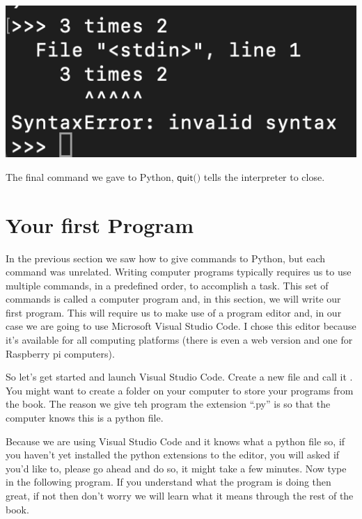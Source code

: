 \begin{center}
    \includegraphics[width=0.3\linewidth]{images/screenshots/SyntaxError.png}
\end{center}

The final command we gave to Python, $\textsf{quit()}$ tells the interpreter to close.

\section{Your first Program}



In the previous section we saw how to give commands to Python, but each command was unrelated. Writing computer programs typically requires us to use multiple commands, in a predefined order, to accomplish a task. This set of commands is called a computer program and, in this section, we will write our first program. This will require us to make use of a program editor and, in our case we are going to use Microsoft Visual Studio Code. I chose this editor because it's available for all computing platforms (there is even a web version and one for Raspberry pi computers).

So let's get started and launch Visual Studio Code. Create a new file and call it . You might want to create a folder on your computer to store your programs from the book. The reason we give teh program the extension ``.py'' is so that the computer knows this is a python file.

Because we are using Visual Studio Code and it knows what a python file so, if you haven't yet installed the python extensions to the editor, you will asked if you'd like to, please go ahead and do so, it might take a few minutes. Now type in the following program. If you understand what the program is doing then great, if not then don't worry we will learn what it means through the rest of the book.

\begin{minipage}{\textwidth}

\end{minipage}

